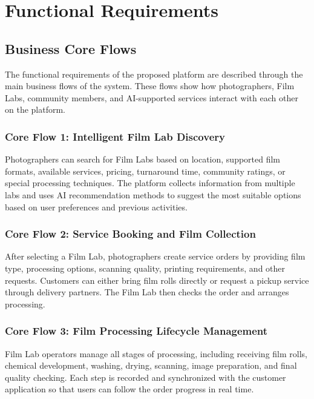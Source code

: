 
\section{Functional Requirements}

\subsection{Business Core Flows}

The functional requirements of the proposed platform are described through the
main business flows of the system. These flows show how photographers, Film
Labs, community members, and AI-supported services interact with each other on
the platform.

\subsubsection{Core Flow 1: Intelligent Film Lab Discovery}

Photographers can search for Film Labs based on location, supported film
formats, available services, pricing, turnaround time, community ratings, or
special processing techniques. The platform collects information from multiple
labs and uses AI recommendation methods to suggest the most suitable options
based on user preferences and previous activities.

\subsubsection{Core Flow 2: Service Booking and Film Collection}

After selecting a Film Lab, photographers create service orders by providing
film type, processing options, scanning quality, printing requirements, and
other requests. Customers can either bring film rolls directly or request a
pickup service through delivery partners. The Film Lab then checks the order
and arranges processing.

\subsubsection{Core Flow 3: Film Processing Lifecycle Management}

Film Lab operators manage all stages of processing, including receiving film
rolls, chemical development, washing, drying, scanning, image preparation, and
final quality checking. Each step is recorded and synchronized with the
customer application so that users can follow the order progress in real time.

